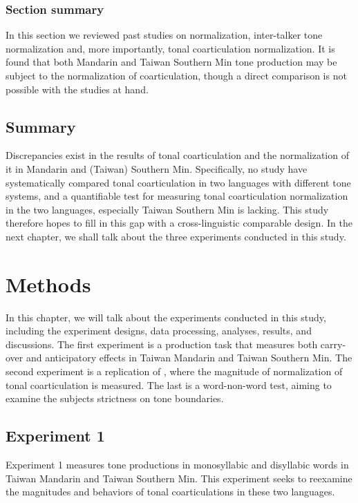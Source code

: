 \documentclass[12pt]{report}
\begin{document}
\begin{CJK}{UTF8}{bsmi}
\subsection{Section summary}
In this section we reviewed past studies on normalization, inter-talker tone normalization and, more importantly, tonal coarticulation normalization. It is found that both Mandarin and Taiwan Southern Min tone production may be subject to the normalization of coarticulation, though a direct comparison is not possible with the studies at hand.

\section{Summary}
Discrepancies exist in the results of tonal coarticulation and the normalization of it in Mandarin and (Taiwan) Southern Min. Specifically, no study have systematically compared tonal coarticulation in two languages with different tone systems, and a quantifiable test for measuring tonal coarticulation normalization in the two languages, especially Taiwan Southern Min is lacking. This study therefore hopes to fill in this gap with a cross-linguistic comparable design. In the next chapter, we shall talk about the three experiments conducted in this study.


\pagebreak
\chapter{Methods}

In this chapter, we will talk about the experiments conducted in this study, including the experiment designs, data processing, analyses, results, and discussions. The first experiment is a production task that measures both carry-over and anticipatory effects in Taiwan Mandarin and Taiwan Southern Min. The second experiment is a replication of \cite{Zhangetal2022}, where the magnitude of normalization of tonal coarticulation is measured. The last is a word-non-word test, aiming to examine the subjects strictness on tone boundaries.


\section{Experiment 1}
Experiment 1 measures tone productions in monosyllabic and disyllabic words in Taiwan Mandarin and Taiwan Southern Min. This experiment seeks to reexamine the magnitudes and behaviors of tonal coarticulations in these two languages.


\end{CJK}
\end{document}
